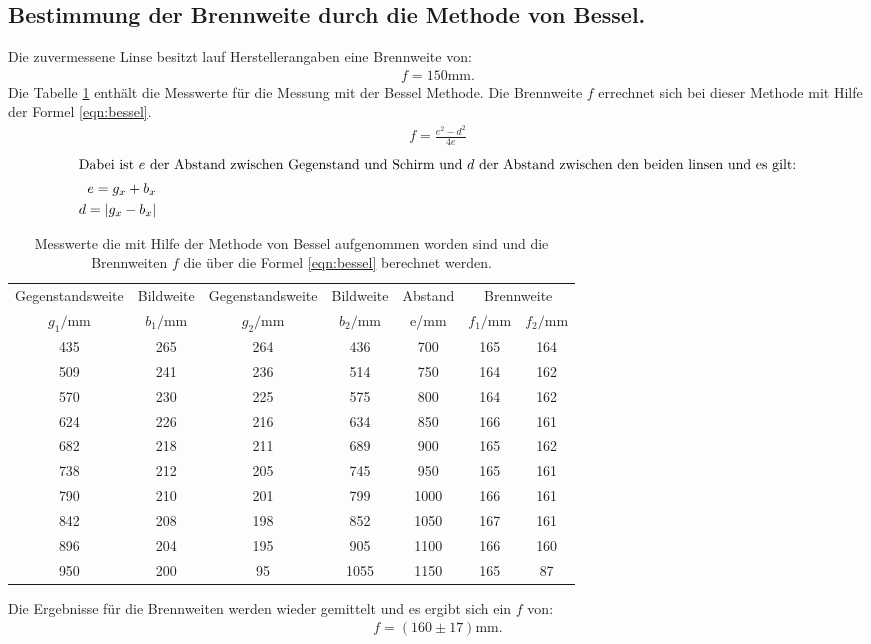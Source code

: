 \subsection{Bestimmung der Brennweite durch die Methode von Bessel.}
Die zuvermessene Linse besitzt lauf Herstellerangaben eine Brennweite von:
\begin{align*}
  f=150\si{\milli\meter}.
\end{align*}
Die Tabelle \ref{tab:bessel} enthält die Messwerte für die Messung mit der Bessel Methode.
Die Brennweite $f$ errechnet sich bei dieser Methode mit Hilfe der Formel \ref{eqn:bessel}.
\begin{align}
    f=\frac{e^2-d^2}{4e}\label{eqn:bessel}
\end{align}
\begin{align*}
    \intertext{Dabei ist $e$ der Abstand zwischen Gegenstand und Schirm und
    $d$ der Abstand zwischen den beiden linsen und es gilt:}
    e=g_x+b_x\\
    d=|g_x-b_x|
\end{align*}
\begin{table}
    \centering
    \caption{Messwerte die mit Hilfe der Methode von Bessel aufgenommen worden sind
    und die Brennweiten $f$ die über die Formel \eqref{eqn:bessel} berechnet werden.}
    \label{tab:bessel}
    \begin{tabular}{c c c c c c c}
    \toprule
    Gegenstandsweite   & Bildweite &  Gegenstandsweite   & Bildweite & Abstand  & \multicolumn{2}{c}{Brennweite}\\
    $g_1/\si{\milli\meter}$ & $b_1/\si{\milli\meter}$ &$g_2/\si{\milli\meter}$ & $b_2/\si{\milli\meter}$ & e/\si{\milli\meter} & $f_1/\si{\milli\meter}$ & $f_2/\si{\milli\meter}$\\
    \midrule
  435  &   265 &   264 &   436  & 700  & 165 & 164 \\
  509  &   241 &   236 &   514  & 750  & 164 & 162 \\
  570  &   230 &   225 &   575  & 800  & 164 & 162 \\
  624  &   226 &   216 &   634  & 850  & 166 & 161 \\
  682  &   218 &   211 &   689  & 900  & 165 & 162 \\
  738  &   212 &   205 &   745  & 950  & 165 & 161 \\
  790  &   210 &   201 &   799  & 1000 & 166 & 161 \\
  842  &   208 &   198 &   852  & 1050 & 167 & 161 \\
  896  &   204 &   195 &   905  & 1100 & 166 & 160 \\
  950  &   200 &    95 &   1055 & 1150 & 165 & 87  \\
  \bottomrule
\end{tabular}
\end{table}
\FloatBarrier
Die Ergebnisse für die Brennweiten
werden wieder gemittelt und es ergibt sich ein $f$ von:
\begin{align*}
  f=(160\pm17)\si{\milli\meter}.
\end{align*}

